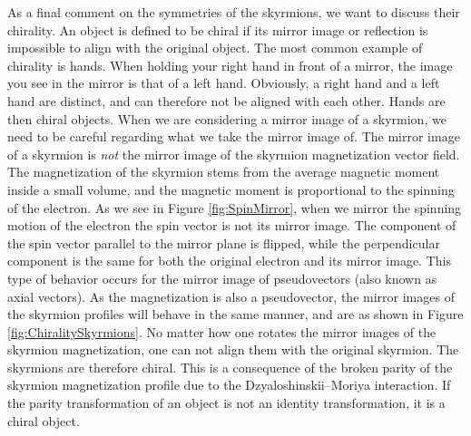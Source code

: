 As a final comment on the symmetries of the skyrmions, we want to discuss their chirality. An object is defined to be chiral if its mirror image or reflection is impossible to align with the original object. The most common example of chirality is hands. When holding your right hand in front of a mirror, the image you see in the mirror is that of a left hand. Obviously, a right hand and a left hand are distinct, and can therefore not be aligned with each other. Hands are then chiral objects. When we are considering a mirror image of a skyrmion, we need to be careful regarding what we take the mirror image of. The mirror image of a skyrmion is \textit{not} the mirror image of the skyrmion magnetization vector field. The magnetization of the skyrmion stems from the average magnetic moment inside a small volume, and the magnetic moment is proportional to the spinning of the electron. As we see in Figure \ref{fig:SpinMirror}, when we mirror the spinning motion of the electron the spin vector is not its mirror image. The component of the spin vector parallel to the mirror plane is flipped, while the perpendicular component is the same for both the original electron and its mirror image. This type of behavior occurs for the mirror image of pseudovectors (also known as axial vectors). As the magnetization is also a pseudovector, the mirror images of the skyrmion profiles will behave in the same manner, and are as shown in Figure \ref{fig:ChiralitySkyrmions}. No matter how one rotates the mirror images of the skyrmion magnetization, one can not align them with the original skyrmion. The skyrmions are therefore chiral. This is a consequence of the broken parity of the skyrmion magnetization profile due to the Dzyaloshinskii--Moriya interaction. If the parity transformation of an object is not an identity transformation, it is a chiral object.

